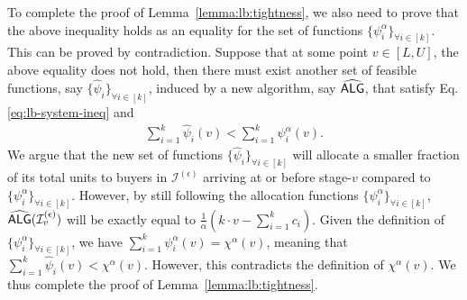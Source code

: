 To complete the proof of Lemma~\ref{lemma:lb:tightness}, we also need to prove that the above inequality holds as an equality for the set of functions $\{\psi^{\alpha}_{i}\}_{\forall i \in [k]}$. This can be proved by contradiction. Suppose that at some point $v \in [L,U]$, the above equality does not hold, then there must exist another set of feasible functions, say ${\{\hat{\psi}_{i}\}}_{\forall i \in [k]}$, induced by a new algorithm, say $\widehat{\textsf{ALG}}$, that satisfy Eq. \eqref{eq:lb-system-ineq} and 
\begin{align*}
    \sum_{i=1}^{k} \hat{\psi}_{i}(v)   < \sum_{i=1}^{k} \psi^{\alpha}_{i}(v) .
\end{align*}
We argue that the new set of functions $\{\hat{\psi}_{i}\}_{\forall i \in [k]}$ will allocate a smaller fraction of its total units to buyers in $\mathcal{I}^{(\epsilon)}$ arriving at or before stage-$v$ compared to $\{\psi^{\alpha}_{i}\}_{\forall i \in [k]}$. However, by still following the allocation functions $\{\psi^{\alpha}_{i}\}_{\forall i \in [k]}$, $\widehat{\textsf{ALG}}(\mathcal{I}^{(\epsilon)}_{v})$ will be exactly equal to $\frac{1}{\alpha} (k \cdot v - \sum_{i=1}^{k} c_{i} )$. Given the definition of $\{\psi^{\alpha}_{i}\}_{\forall i \in [k]}$, we have $\sum_{i=1}^{k} \psi^{\alpha}_{i}(v) = \chi^{\alpha}(v)$, meaning that $\sum_{i=1}^{k} \hat{\psi}_{i}(v) < \chi^{\alpha}(v)$. However, this  contradicts the definition of $\chi^{\alpha}(v)$.
We thus complete the proof of Lemma~\ref{lemma:lb:tightness}.


